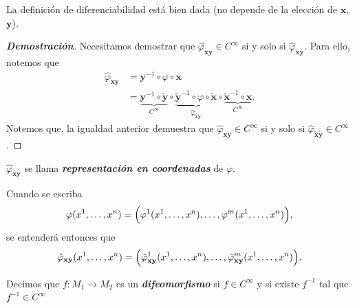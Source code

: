 \begin{theorem}
La definici\'on de diferenciabilidad est\'a bien dada (no depende de la elecci\'on de $\mathbf{x}$,$\mathbf{y}$).
\end{theorem}
\begin{proof}[\textbf{Demostraci\'on}]
Necesitamos demostrar que $\hat{\varphi}_{\mathbf{xy}}\in C^{\infty}$ si y solo si $\hat{\varphi}_{\tilde{\mathbf{x}}\tilde{\mathbf{y}}}$.
Para ello, notemos que 
\begin{align*}
    \hat{\varphi}_{\mathbf{xy}}&=\mathbf{y}^{-1}\circ\varphi\circ\mathbf{x}\\
    &=\underbrace{\mathbf{y}^{-1}\circ\tilde{\mathbf{y}}}_{C^\infty}\circ\underbrace{\tilde{\mathbf{y}}^{-1}\circ\varphi\circ\tilde{\mathbf{x}}}_{\hat{\varphi}_{\tilde{\mathbf{x}}\tilde{\mathbf{y}}}}\circ\underbrace{\tilde{\mathbf{x}}^{-1}\circ\mathbf{x}}_{C^\infty}.
\end{align*}
Notemos que, la igualdad anterior demuestra que $\hat{\varphi}_{\mathbf{xy}}\in C^{\infty}$ si y solo si $\hat{\varphi}_{\tilde{\mathbf{x}}\tilde{\mathbf{y}}}\in C^{\infty}$.
\end{proof}

\begin{definition}
$\hat{\varphi}_{\mathbf{xy}}$ se llama \textit{\textbf{representaci\'on en coordenadas}} de $\varphi$.    
\end{definition}

\begin{notation}
Cuando se escriba
\begin{equation*}
    \varphi(x^1,\dots,x^n)=\Bigl(\varphi^1(x^1,\dots,x^n),\dots,\varphi^m(x^1,\dots,x^n)\Bigl),
\end{equation*}
se entender\'a entonces que
\begin{equation*}
    \hat{\varphi}_{\mathbf{xy}}(x^1,\dots,x^n)=\Bigl(\hat{\varphi}_{\mathbf{xy}}^1(x^1,\dots,x^n),\dots,\hat{\varphi}_{\mathbf{xy}}^m(x^1,\dots,x^n)\Bigl).
\end{equation*}
\end{notation}

\begin{definition}
Decimos que $f\colon M_1\to M_2$ es un \textit{\textbf{difeomorfismo}} si $f\in C^\infty$ y si existe $f^{-1}$ tal que $f^{-1}\in C^\infty$   
\end{definition}

